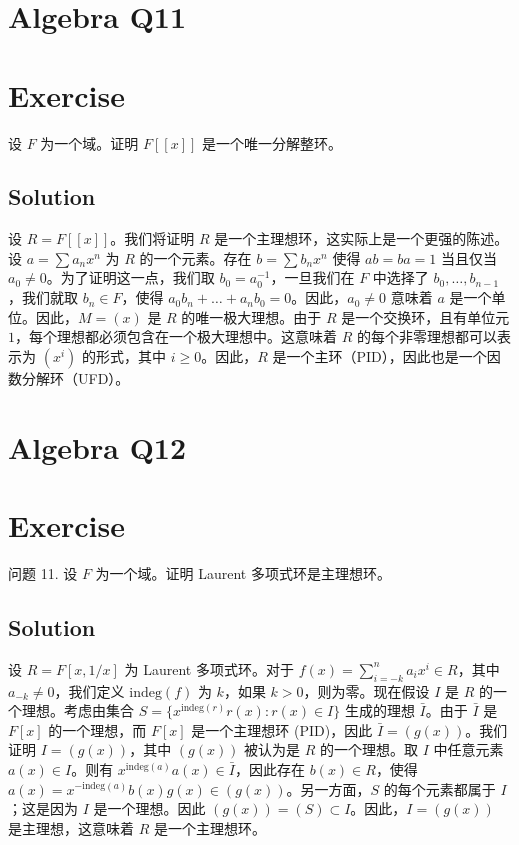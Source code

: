 \documentclass[12pt]{book}
\begin{document}
\section{Algebra Q11}
\section*{Exercise}
设 $F$ 为一个域。证明 $F[[x]]$ 是一个唯一分解整环。



\subsection*{Solution}
设 $R = F[[x]]$。我们将证明 $R$ 是一个主理想环，这实际上是一个更强的陈述。设 $a = \sum a_n x^n$ 为 $R$ 的一个元素。存在 $b = \sum b_n x^n$ 使得 $ab = ba = 1$ 当且仅当 $a_0 \neq 0$。为了证明这一点，我们取 $b_0 = a_0^{-1}$，一旦我们在 $F$ 中选择了 $b_0, \dots, b_{n-1}$，我们就取 $b_n \in F$，使得 $a_0 b_n + \dots + a_n b_0 = 0$。因此，$a_0 \neq 0$ 意味着 $a$ 是一个单位。因此，$M = (x)$ 是 $R$ 的唯一极大理想。由于 $R$ 是一个交换环，且有单位元 $1$，每个理想都必须包含在一个极大理想中。这意味着 $R$ 的每个非零理想都可以表示为 $(x^i)$ 的形式，其中 $i \geq 0$。因此，$R$ 是一个主环（PID），因此也是一个因数分解环（UFD）。
\newpage
\section{Algebra Q12}
\section*{Exercise}
问题 11. 设 $F$ 为一个域。证明 Laurent 多项式环是主理想环。



\subsection*{Solution}
设 $R = F[x,1/x]$ 为 Laurent 多项式环。对于 $f(x) = \sum_{i=-k}^{n}a_ix^i \in R$，其中 $a_{-k} \neq 0$，我们定义 $\text{indeg}(f)$ 为 $k$，如果 $k > 0$，则为零。现在假设 $I$ 是 $R$ 的一个理想。考虑由集合 $S = \{x^{\text{indeg}(r)}r(x) : r(x) \in I\}$ 生成的理想 $\bar{I}$。由于 $\bar{I}$ 是 $F[x]$ 的一个理想，而 $F[x]$ 是一个主理想环 (PID)，因此 $\bar{I} = (g(x))$。我们证明 $I = (g(x))$，其中 $(g(x))$ 被认为是 $R$ 的一个理想。取 $I$ 中任意元素 $a(x) \in I$。则有 $x^{\text{indeg}(a)}a(x) \in \bar{I}$，因此存在 $b(x) \in R$，使得 $a(x) = x^{-\text{indeg}(a)}b(x)g(x) \in (g(x))$。另一方面，$S$ 的每个元素都属于 $I$；这是因为 $I$ 是一个理想。因此 $(g(x)) = (S) \subset I$。因此，$I = (g(x))$ 是主理想，这意味着 $R$ 是一个主理想环。
\newpage
\end{document}
